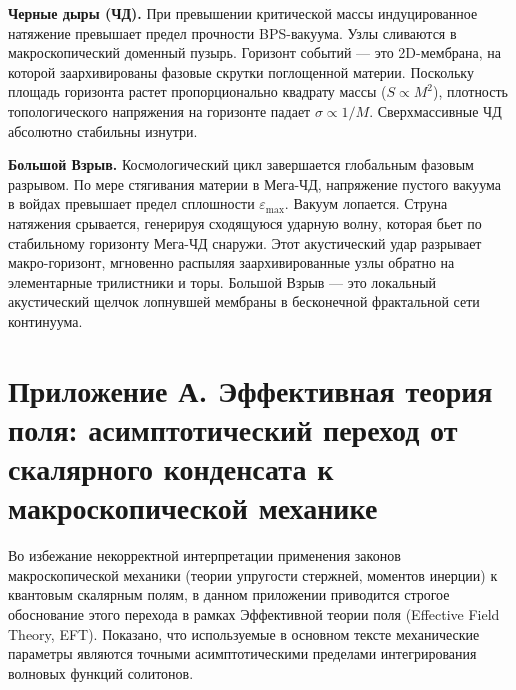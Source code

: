 \documentclass[12pt,a4paper]{article}
\begin{document}
\textbf{Черные дыры (ЧД).} При превышении критической массы индуцированное натяжение превышает предел прочности BPS-вакуума. Узлы сливаются в макроскопический доменный пузырь. Горизонт событий — это 2D-мембрана, на которой заархивированы фазовые скрутки поглощенной материи. Поскольку площадь горизонта растет пропорционально квадрату массы ($S \propto M^2$), плотность топологического напряжения на горизонте падает $\sigma \propto 1/M$. Сверхмассивные ЧД абсолютно стабильны изнутри.

\textbf{Большой Взрыв.} Космологический цикл завершается глобальным фазовым разрывом. По мере стягивания материи в Мега-ЧД, напряжение пустого вакуума в войдах превышает предел сплошности $\varepsilon_{\text{max}}$. Вакуум лопается. Струна натяжения срывается, генерируя сходящуюся ударную волну, которая бьет по стабильному горизонту Мега-ЧД снаружи. Этот акустический удар разрывает макро-горизонт, мгновенно распыляя заархивированные узлы обратно на элементарные трилистники и торы. Большой Взрыв — это локальный акустический щелчок лопнувшей мембраны в бесконечной фрактальной сети континуума.

\section*{Приложение А. Эффективная теория поля: асимптотический переход от скалярного конденсата к макроскопической механике}

Во избежание некорректной интерпретации применения законов макроскопической механики (теории упругости стержней, моментов инерции) к квантовым скалярным полям, в данном приложении приводится строгое обоснование этого перехода в рамках Эффективной теории поля (Effective Field Theory, EFT). Показано, что используемые в основном тексте механические параметры являются точными асимптотическими пределами интегрирования волновых функций солитонов.
\end{document}
